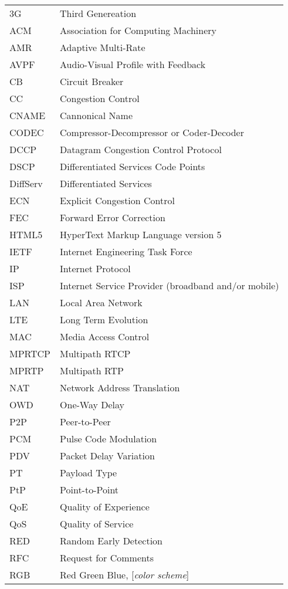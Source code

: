 \begin{longtable}{ll}
3G  	& Third Genereation \\
ACM 	& Association for Computing Machinery \\
AMR 	& Adaptive Multi-Rate \\
AVPF	& Audio-Visual Profile with Feedback \\
CB  	& Circuit Breaker \\
CC  	& Congestion Control \\
CNAME	& Cannonical Name \\
CODEC	& Compressor-Decompressor or Coder-Decoder \\
DCCP 	& Datagram Congestion Control Protocol \\
DSCP 	& Differentiated Services Code Points \\
DiffServ	& Differentiated Services \\
ECN  	& Explicit Congestion Control \\
FEC  	& Forward Error Correction \\
HTML5	& HyperText Markup Language version 5\\
IETF	& Internet Engineering Task Force \\
IP  	& Internet Protocol \\
ISP 	& Internet Service Provider (broadband and/or mobile)\\
LAN 	& Local Area Network \\
LTE 	& Long Term Evolution \\
MAC 	& Media Access Control \\
MPRTCP	& Multipath RTCP \\
MPRTP 	& Multipath RTP \\
NAT 	& Network Address Translation \\
OWD 	& One-Way Delay \\
P2P 	& Peer-to-Peer \\
PCM 	& Pulse Code Modulation \\
PDV  	& Packet Delay Variation \\
PT  	& Payload Type \\
PtP 	& Point-to-Point \\
QoE 	& Quality of Experience \\
QoS 	& Quality of Service \\
RED 	& Random Early Detection \\
RFC 	& Request for Comments \\
RGB 	& Red Green Blue, [\textit{color scheme}] \\

\end{longtable}
